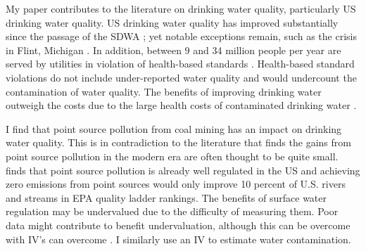 \documentclass[12pt]{article}
\begin{document}



My paper contributes to the literature on drinking water quality, particularly US drinking water quality. US drinking water quality has improved substantially since the passage of the SDWA \parencite{keiser2019consequences}; yet notable exceptions remain, such as the crisis in Flint, Michigan \parencite{christensen2023flint}. In addition, between 9 and 34 million people per year are served by utilities in violation of health-based standards \parencite{allaire2018national}. Health-based standard violations do not include under-reported water quality and would undercount the contamination of water quality. The benefits of improving drinking water outweigh the costs due to the large health costs of contaminated drinking water \parencite{hill2017shale, keiser2019us, disalvo2024drinking, marcus2025testing}.

I find that point source pollution from coal mining has an impact on drinking water quality. This is in contradiction to the literature that finds the gains from point source pollution in the modern era are often thought to be quite small. \parencite{bingham2000} finds that point source pollution is already well regulated in the US and achieving zero emissions from point sources would only improve 10 percent of U.S. rivers and streams in EPA quality ladder rankings. The benefits of surface water regulation may be undervalued due to the difficulty of measuring them. Poor data might contribute to benefit undervaluation, although this can be overcome with IV's can overcome \parencite{keiser2019missing}. I similarly use an IV to estimate water contamination.
\end{document}
